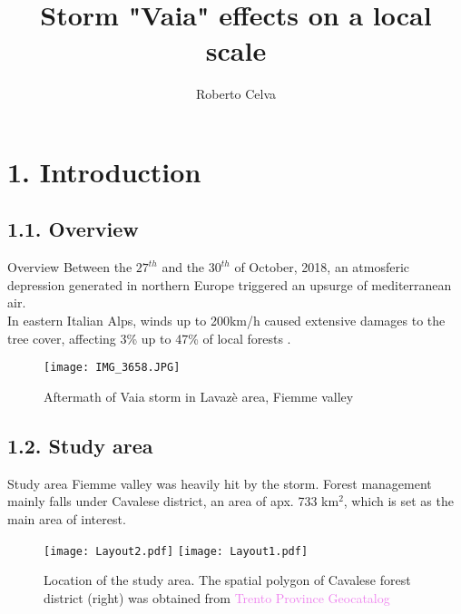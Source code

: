 \documentclass[9pt]{beamer}
\title[...]{\LARGE Storm "Vaia" effects on a local scale}
\author{\normalsize Roberto Celva \inst{1}}
\institute{\small \inst{1} Environmental Assessment and Management
}
\begin{document}
	
	\begin{frame}[plain]
		\titlepage
	\end{frame}
	
	\section{1. Introduction}
	\subsection{1.1. Overview}
		\begin{frame}{Overview}
				\justifying
				Between the $27^{th}$ and the $30^{th}$ of October, 2018, an atmosferic depression generated in northern Europe triggered an upsurge of mediterranean air.\\
				
				\bigskip
				In eastern Italian Alps, winds up to 200km/h caused extensive damages to the tree cover, affecting 3\% up to 47\% of local forests \citep{chirici}.
			\begin{figure}
				\centering
				\texttt{[image: IMG\_3658.JPG]} \caption{\scriptsize Aftermath of Vaia storm in Lavazè area, Fiemme valley}
			\end{figure}
		\end{frame}
	
	\subsection{1.2. Study area}
	\begin{frame}{Study area}
		\justifying
		Fiemme valley was heavily hit by the storm. Forest management mainly falls under Cavalese district, an area of apx. 733 km$^2$, which is set as the main area of interest.
	\begin{figure}
		\texttt{[image: Layout2.pdf]}
		\texttt{[image: Layout1.pdf]}
		\caption{\scriptsize Location of the study area. The spatial polygon of Cavalese forest district (right) was obtained from \textcolor{violet}{Trento Province Geocatalog} \href{https://siat.provincia.tn.it/geonetwork}{}}
	\end{figure}
\end{frame}
\end{document}
